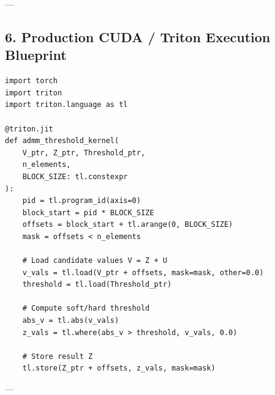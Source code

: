---

\subsection{6. Production CUDA / Triton Execution Blueprint}

\begin{lstlisting}
import torch
import triton
import triton.language as tl

@triton.jit
def admm_threshold_kernel(
    V_ptr, Z_ptr, Threshold_ptr,
    n_elements,
    BLOCK_SIZE: tl.constexpr
):
    pid = tl.program_id(axis=0)
    block_start = pid * BLOCK_SIZE
    offsets = block_start + tl.arange(0, BLOCK_SIZE)
    mask = offsets < n_elements

    # Load candidate values V = Z + U
    v_vals = tl.load(V_ptr + offsets, mask=mask, other=0.0)
    threshold = tl.load(Threshold_ptr)

    # Compute soft/hard threshold
    abs_v = tl.abs(v_vals)
    z_vals = tl.where(abs_v > threshold, v_vals, 0.0)

    # Store result Z
    tl.store(Z_ptr + offsets, z_vals, mask=mask)
\end{lstlisting}


---